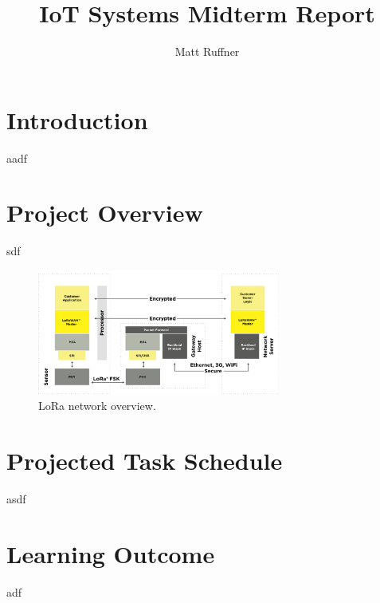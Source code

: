 \documentclass{IEEEtran}
\title{IoT Systems Midterm Report}
\author{Matt Ruffner}
\date{}
\begin{document}
\maketitle


\section{Introduction}
aadf

\section{Project Overview} 
sdf

\begin{figure}[h!]
    \centering
    \includegraphics[width=8cm]{../doc/midterm/images/lorasystem}
    \caption{LoRa network overview.}
    \label{fig:lora_overview}
\end{figure}
\section{Projected Task Schedule} 
asdf

\section{Learning Outcome}
adf



\end{document}
